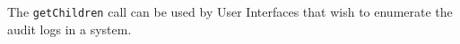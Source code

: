 The \verb+getChildren+ call can be used by User Interfaces that wish to enumerate the audit logs
in a system.
